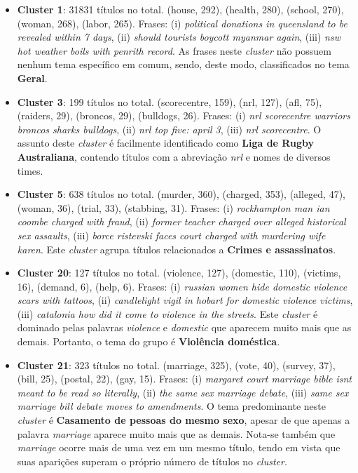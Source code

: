 \documentclass[10pt,twocolumn,letterpaper]{article}
\begin{document}
\begin{itemize}
  \item \textbf {Cluster 1}: 31831 títulos no total. (house, 292), (health, 280), (school, 270), (woman, 268), (labor, 265). Frases: (i) \textit{political donations in queensland to be revealed within 7 days}, (ii) \textit{should tourists boycott myanmar again}, (iii) \textit{nsw hot weather boils with penrith record}. As frases neste \textit{cluster} não possuem nenhum tema específico em comum, sendo, deste modo, classificados no tema \textbf{Geral}.

  \item \textbf {Cluster 3}: 199 títulos no total. (scorecentre, 159), (nrl, 127), (afl, 75), (raiders, 29), (broncos, 29), (bulldogs, 26). Frases: (i) \textit{nrl scorecentre warriors broncos sharks bulldogs}, (ii) \textit{nrl top five: april 3}, (iii) \textit{nrl scorecentre}. O assunto deste \textit{cluster} é facilmente identificado como \textbf{Liga de Rugby Australiana}, contendo títulos com a abreviação \textit{nrl} e nomes de diversos times.

  \item \textbf {Cluster 5}: 638 títulos no total.  (murder, 360), (charged, 353), (alleged, 47), (woman, 36), (trial, 33), (stabbing, 31). Frases: (i) \textit{      rockhampton man ian coombe charged with fraud}, (ii) \textit{former teacher charged over alleged historical sex assaults}, (iii) \textit{borce ristevski faces court charged with murdering wife karen}. Este \textit{cluster} agrupa títulos relacionados a \textbf{Crimes e assassinatos}.

  \item \textbf {Cluster 20}: 127 títulos no total.  (violence, 127), (domestic, 110), (victims, 16), (demand, 6), (help, 6). Frases: (i) \textit{russian women hide domestic violence scars with tattoos}, (ii) \textit{candlelight vigil in hobart for domestic violence victims}, (iii) \textit{catalonia how did it come to violence in the streets}. Este \textit{cluster} é dominado pelas palavras \textit{violence} e \textit{domestic} que aparecem muito mais que as demais. Portanto, o tema do grupo é  \textbf{Violência doméstica}.

  \item \textbf {Cluster 21}: 323 títulos no total. (marriage, 325), (vote, 40), (survey, 37), (bill, 25), (postal, 22), (gay, 15). Frases: (i) \textit{margaret court marriage bible isnt meant to be read so literally}, (ii) \textit{the same sex marriage debate}, (iii) \textit{same sex marriage bill debate moves to amendments}. O tema predominante neste \textit{cluster} é \textbf{Casamento de pessoas do mesmo sexo}, apesar de que apenas a palavra \textit{marriage} aparece muito mais que as demais. Nota-se também que \textit{marriage} ocorre mais de uma vez em um mesmo título, tendo em vista que suas aparições superam o próprio número de títulos no \textit{cluster}.


\end{itemize}
\end{document}
